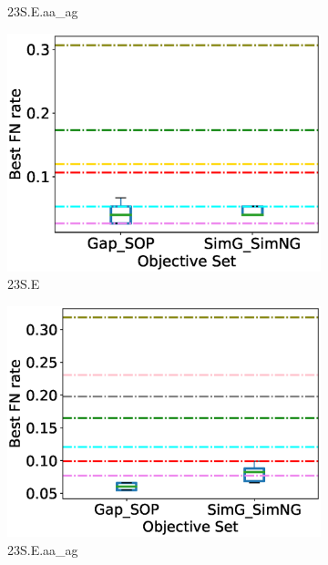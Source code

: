 \begin{figure}[!htbp]
\begin{adjustwidth}{-0.5cm}{-0.5cm}
\begin{subfigure}[b]{0.25\textwidth}
			\caption{23S.E.aa\_ag}
		\end{subfigure}
		\begin{subfigure}[b]{0.25\textwidth}
			\includegraphics[width=\columnwidth]{Figure/summary/precomputedInit/23S.E/objset_fnrate_rank}
			\caption{23S.E}
		\end{subfigure}    
		\begin{subfigure}[b]{0.25\textwidth}
			\includegraphics[width=\columnwidth]{Figure/summary/precomputedInit/23S.E.aa_ag/objset_fnrate_rank}
			\caption{23S.E.aa\_ag}
		\end{subfigure}
		\begin{subfigure}{0.25\textwidth}

\end{subfigure}
\end{adjustwidth}
\end{figure}
